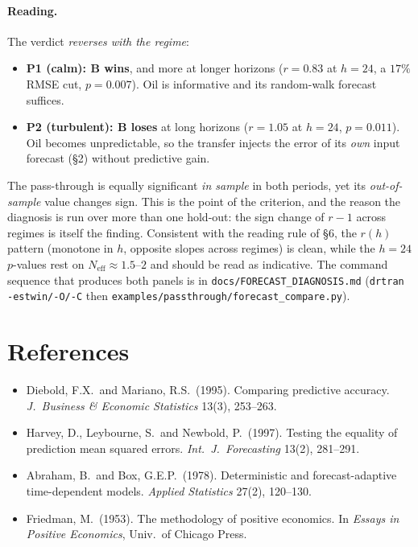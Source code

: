 \documentclass[11pt]{article}
\begin{document}
\paragraph{Reading.} The verdict \emph{reverses with the regime}:
\begin{itemize}\itemsep0pt
\item \textbf{P1 (calm): B wins}, and more at longer horizons ($r=0.83$ at $h=24$, a
      $17\%$ RMSE cut, $p=0.007$). Oil is informative and its random-walk forecast
      suffices.
\item \textbf{P2 (turbulent): B loses} at long horizons ($r=1.05$ at $h=24$,
      $p=0.011$). Oil becomes unpredictable, so the transfer injects the error of its
      \emph{own} input forecast (\S2) without predictive gain.
\end{itemize}
The pass-through is equally significant \emph{in sample} in both periods, yet its
\emph{out-of-sample} value changes sign. This is the point of the criterion, and the
reason the diagnosis is run over more than one hold-out: the sign change of $r-1$
across regimes is itself the finding. Consistent with the reading rule of \S6, the
$r(h)$ pattern (monotone in $h$, opposite slopes across regimes) is clean, while the
$h=24$ $p$-values rest on $N_{\mathrm{eff}}\approx1.5$--$2$ and should be read as
indicative. The command sequence that produces both panels is in
\texttt{docs/FORECAST\_DIAGNOSIS.md} (\texttt{drtran -estwin/-O/-C} then
\texttt{examples/passthrough/forecast\_compare.py}).

\section*{References}
\begin{itemize}\itemsep0pt
\item Diebold, F.X.\ and Mariano, R.S.\ (1995). Comparing predictive accuracy.
      \emph{J.\ Business \& Economic Statistics} 13(3), 253--263.
\item Harvey, D., Leybourne, S.\ and Newbold, P.\ (1997). Testing the equality of
      prediction mean squared errors. \emph{Int.\ J.\ Forecasting} 13(2), 281--291.
\item Abraham, B.\ and Box, G.E.P.\ (1978). Deterministic and forecast-adaptive
      time-dependent models. \emph{Applied Statistics} 27(2), 120--130.
\item Friedman, M.\ (1953). The methodology of positive economics. In
      \emph{Essays in Positive Economics}, Univ.\ of Chicago Press.
\end{itemize}
\end{document}
